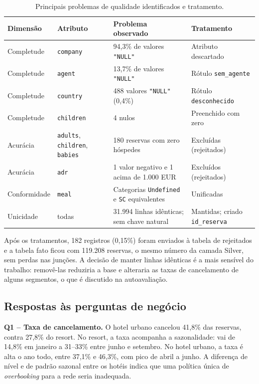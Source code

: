 \documentclass[11pt,a4paper]{article}
\begin{document}
\begin{table}[!htb]
\centering\footnotesize
\caption{Principais problemas de qualidade identificados e tratamento.}\label{tab:qualidade}
\begin{tabularx}{\textwidth}{@{}l l X X@{}}
\toprule
\textbf{Dimensão} & \textbf{Atributo} & \textbf{Problema observado} & \textbf{Tratamento} \\
\midrule
Completude & \texttt{company} & 94,3\% de valores \texttt{"NULL"} & Atributo descartado \\
Completude & \texttt{agent} & 13,7\% de valores \texttt{"NULL"} & Rótulo \texttt{sem\_agente} \\
Completude & \texttt{country} & 488 valores \texttt{"NULL"} (0,4\%) & Rótulo \texttt{desconhecido} \\
Completude & \texttt{children} & 4 nulos & Preenchido com zero \\
Acurácia & \texttt{adults}, \texttt{children}, \texttt{babies} & 180 reservas com zero hóspedes & Excluídas (rejeitados) \\
Acurácia & \texttt{adr} & 1 valor negativo e 1 acima de 1.000 EUR & Excluídos (rejeitados) \\
Conformidade & \texttt{meal} & Categorias \texttt{Undefined} e \texttt{SC} equivalentes & Unificadas \\
Unicidade & todas & 31.994 linhas idênticas; sem chave natural & Mantidas; criado \texttt{id\_reserva} \\
\bottomrule
\end{tabularx}
\end{table}

Após os tratamentos, 182 registros (0,15\%) foram enviados à tabela de rejeitados e a tabela fato ficou com 119.208 reservas, o mesmo número da camada Silver, sem perdas nas junções. A decisão de manter linhas idênticas é a mais sensível do trabalho: removê-las reduziria a base e alteraria as taxas de cancelamento de alguns segmentos, o que é discutido na autoavaliação.

\subsection{Respostas às perguntas de negócio}

\textbf{Q1 -- Taxa de cancelamento.} O hotel urbano cancelou 41,8\% das reservas, contra 27,8\% do resort. No resort, a taxa acompanha a sazonalidade: vai de 14,8\% em janeiro a 31--33\% entre junho e setembro. No hotel urbano, a taxa é alta o ano todo, entre 37,1\% e 46,3\%, com pico de abril a junho. A diferença de nível e de padrão sazonal entre os hotéis indica que uma política única de \textit{overbooking} para a rede seria inadequada.
\end{document}
